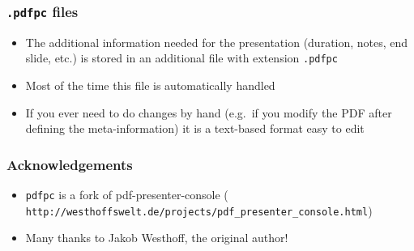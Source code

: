 \documentclass{beamer}
\newcommand{\pdfpc}{\texttt{pdfpc}\xspace}
\newcommand{\opt}[1]{\texttt{#1}\xspace}
\begin{document}
\begin{frame}
  \frametitle{\opt{.pdfpc} files}
  \begin{itemize}
    \item The additional information needed for the presentation (duration,
      notes, end slide, etc.) is stored in an additional file with extension
      \opt{.pdfpc}
    \item Most of the time this file is automatically handled
    \item If you ever need to do changes by hand (e.g.\ if you modify the PDF
      after defining the meta-information) it is a text-based format easy to
      edit
  \end{itemize}
\end{frame}

\begin{frame}[fragile]
  \frametitle{Acknowledgements}
  \begin{itemize}
    \item \pdfpc is a fork of pdf-presenter-console
      ({\footnotesize
        \verb+http://westhoffswelt.de/projects/pdf_presenter_console.html+})
    \item Many thanks to Jakob Westhoff, the original author!
  \end{itemize}
\end{frame}
\end{document}
